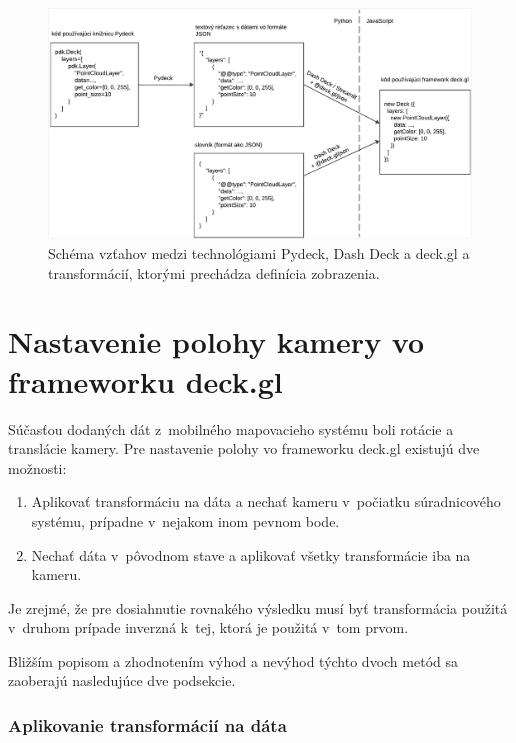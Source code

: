 \begin{figure}[h]
    \centering
    \includegraphics[width=1\linewidth]{text_prace/obrazky-figures/pydeck_dashdeck_transformacie.pdf}
    \caption[Schéma vzťahov medzi technológiami Pydeck, Dash Deck a deck.gl.]{Schéma vzťahov medzi technológiami Pydeck, Dash Deck a deck.gl a transformácií, ktorými prechádza definícia zobrazenia.}
    \label{fig:pydeck_dashdeck_schema}
\end{figure}

\section{Nastavenie polohy kamery vo frameworku deck.gl}
\label{sec:nastavenie_polohy_kamery}

Súčasťou dodaných dát z~mobilného mapovacieho systému boli rotácie a translácie kamery. Pre nastavenie polohy vo frameworku deck.gl existujú dve možnosti:

\begin{enumerate}
    \item Aplikovať transformáciu na dáta a nechať kameru v~počiatku súradnicového systému, prípadne v~nejakom inom pevnom bode.
    \item Nechať dáta v~pôvodnom stave a aplikovať všetky transformácie iba na kameru.
\end{enumerate}

Je zrejmé, že pre dosiahnutie rovnakého výsledku musí byť transformácia použitá v~druhom prípade inverzná k~tej, ktorá je použitá v~tom prvom.

Bližším popisom a zhodnotením výhod a nevýhod týchto dvoch metód sa zaoberajú nasledujúce dve podsekcie.

\subsubsection{Aplikovanie transformácií na dáta}

